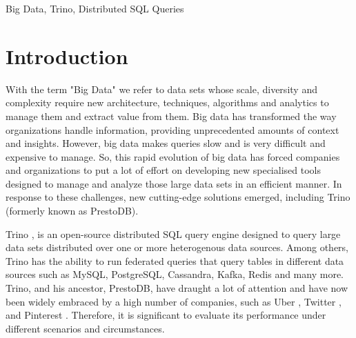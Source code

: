 \documentclass[conference]{IEEEtran}
\begin{document}
\begin{IEEEkeywords}
    Big Data, Trino, Distributed SQL Queries
\end{IEEEkeywords}

\section{Introduction}
With the term "Big Data" we refer to data sets whose scale, diversity and complexity require new
architecture, techniques, algorithms and analytics to manage them and extract value from them.
Big data has transformed the way organizations handle information, providing unprecedented
amounts of context and insights. However, big data makes queries slow and is very difficult and
expensive to manage. So, this rapid evolution of big data has forced companies and organizations
to put a lot of effort on  developing new specialised tools designed to manage and analyze those
large data sets in an efficient manner. In response to these challenges, new cutting-edge solutions
emerged, including Trino (formerly known as PrestoDB).

Trino \cite{b3}, is an open-source distributed SQL query engine designed to query large data sets distributed over
one or more heterogenous data sources. Among others, Trino has the ability to run federated queries that
query tables in different data sources such as MySQL, PostgreSQL, Cassandra, Kafka, Redis and many more.
Trino, and his ancestor, PrestoDB, have draught a lot of attention and have now been widely embraced by a high number of
companies, such as Uber \cite{b4}, Twitter \cite{b5}, \cite{b6} and Pinterest \cite{b7}. Therefore, it is significant to evaluate its performance under different
scenarios and circumstances.
\end{document}
